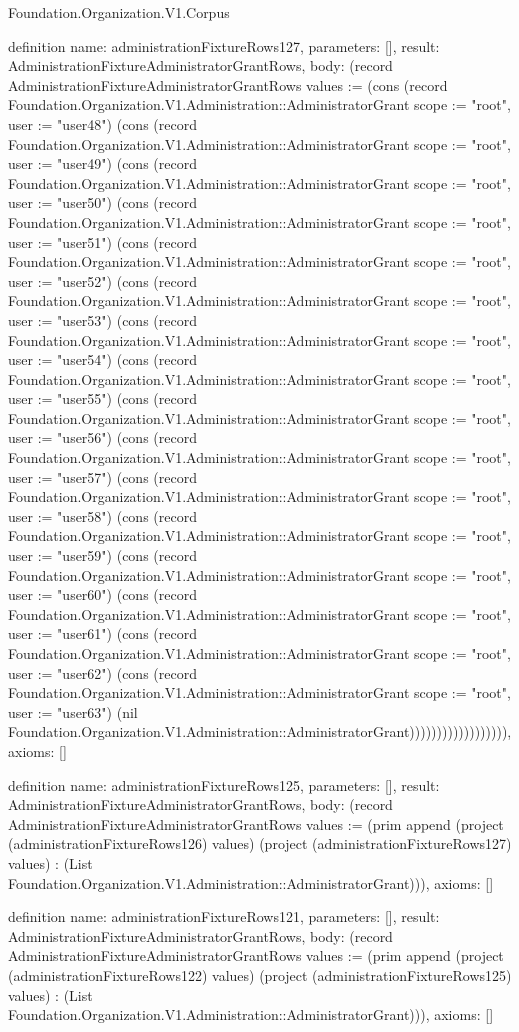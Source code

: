 \begin{lexlean}{Foundation.Organization.V1.Corpus}
\begin{semanticmodule}
definition{
  name: administrationFixtureRows127,
  parameters: [],
  result: AdministrationFixtureAdministratorGrantRows,
  body: (record AdministrationFixtureAdministratorGrantRows {values := (cons (record Foundation.Organization.V1.Administration::AdministratorGrant {scope := "root", user := "user48"}) (cons (record Foundation.Organization.V1.Administration::AdministratorGrant {scope := "root", user := "user49"}) (cons (record Foundation.Organization.V1.Administration::AdministratorGrant {scope := "root", user := "user50"}) (cons (record Foundation.Organization.V1.Administration::AdministratorGrant {scope := "root", user := "user51"}) (cons (record Foundation.Organization.V1.Administration::AdministratorGrant {scope := "root", user := "user52"}) (cons (record Foundation.Organization.V1.Administration::AdministratorGrant {scope := "root", user := "user53"}) (cons (record Foundation.Organization.V1.Administration::AdministratorGrant {scope := "root", user := "user54"}) (cons (record Foundation.Organization.V1.Administration::AdministratorGrant {scope := "root", user := "user55"}) (cons (record Foundation.Organization.V1.Administration::AdministratorGrant {scope := "root", user := "user56"}) (cons (record Foundation.Organization.V1.Administration::AdministratorGrant {scope := "root", user := "user57"}) (cons (record Foundation.Organization.V1.Administration::AdministratorGrant {scope := "root", user := "user58"}) (cons (record Foundation.Organization.V1.Administration::AdministratorGrant {scope := "root", user := "user59"}) (cons (record Foundation.Organization.V1.Administration::AdministratorGrant {scope := "root", user := "user60"}) (cons (record Foundation.Organization.V1.Administration::AdministratorGrant {scope := "root", user := "user61"}) (cons (record Foundation.Organization.V1.Administration::AdministratorGrant {scope := "root", user := "user62"}) (cons (record Foundation.Organization.V1.Administration::AdministratorGrant {scope := "root", user := "user63"}) (nil Foundation.Organization.V1.Administration::AdministratorGrant)))))))))))))))))}),
  axioms: []
}

definition{
  name: administrationFixtureRows125,
  parameters: [],
  result: AdministrationFixtureAdministratorGrantRows,
  body: (record AdministrationFixtureAdministratorGrantRows {values := (prim append (project (administrationFixtureRows126) values) (project (administrationFixtureRows127) values) : (List Foundation.Organization.V1.Administration::AdministratorGrant))}),
  axioms: []
}

definition{
  name: administrationFixtureRows121,
  parameters: [],
  result: AdministrationFixtureAdministratorGrantRows,
  body: (record AdministrationFixtureAdministratorGrantRows {values := (prim append (project (administrationFixtureRows122) values) (project (administrationFixtureRows125) values) : (List Foundation.Organization.V1.Administration::AdministratorGrant))}),
  axioms: []
}


\end{semanticmodule}
\end{lexlean}
